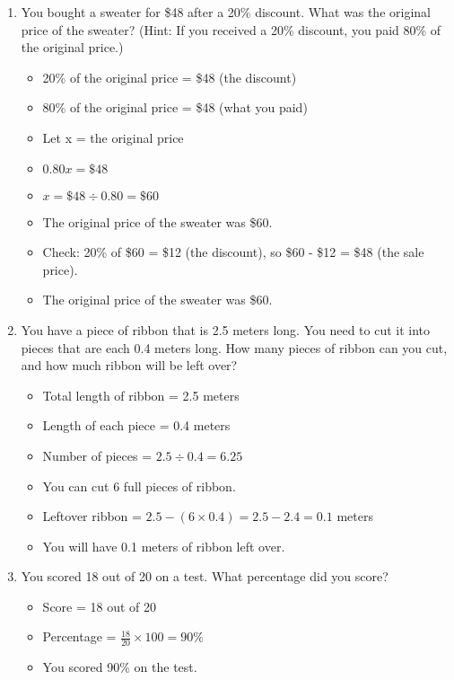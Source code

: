\begin{enumerate}[label=(\alph*)]
    \item You bought a sweater for \$48 after a 20\% discount. What was the original price of the sweater? (Hint: If you received a 20\% discount, you paid 80\% of the original price.)
    \begin{itemize}
        \item 20\% of the original price = \$48 (the discount)
        \item 80\% of the original price = \$48 (what you paid)
        \item Let x = the original price
        \item $0.80x = \$48$
        \item $x = \$48 \div 0.80 = \$60$
        \item The original price of the sweater was \$60.
        \item Check: 20\% of \$60 = \$12 (the discount), so \$60 - \$12 = \$48 (the sale price).
        \item The original price of the sweater was \$60.
    \end{itemize}
    \item You have a piece of ribbon that is 2.5 meters long. You need to cut it into pieces that are each 0.4 meters long. How many pieces of ribbon can you cut, and how much ribbon will be left over?
        \begin{itemize}
            \item Total length of ribbon = 2.5 meters
            \item Length of each piece = 0.4 meters
            \item Number of pieces = $2.5 \div 0.4 = 6.25$
            \item You can cut 6 full pieces of ribbon.
            \item Leftover ribbon = $2.5 - (6 \times 0.4) = 2.5 - 2.4 = 0.1$ meters
            \item You will have 0.1 meters of ribbon left over.
        \end{itemize}
    \item You scored 18 out of 20 on a test. What percentage did you score?
        \begin{itemize}
            \item Score = 18 out of 20
            \item Percentage = $\frac{18}{20} \times 100 = 90\%$
            \item You scored 90\% on the test.

\end{itemize}
\end{enumerate}
